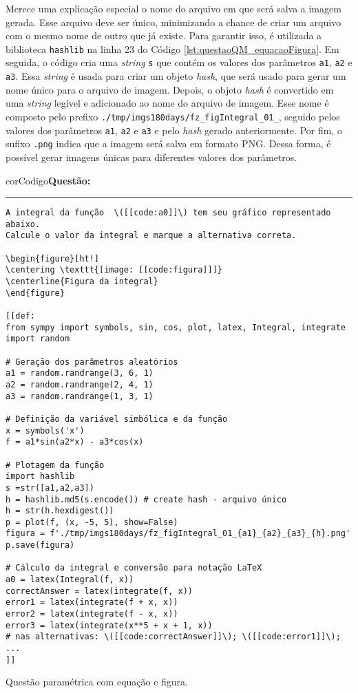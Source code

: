 Merece uma explicação especial o nome do arquivo em que será salva a imagem gerada. Esse arquivo deve ser único, minimizando a chance de criar um arquivo com o mesmo nome de outro que já existe. Para garantir isso, é utilizada a biblioteca \verb|hashlib| na linha 23 do Código \ref{lst:questaoQM_equacaoFigura}. Em seguida, o código cria uma \textit{string} \verb|s| que contém os valores dos parâmetros \verb|a1|, \verb|a2| e \verb|a3|. Essa \textit{string} é usada para criar um objeto \textit{hash}, que será usado para gerar um nome único para o arquivo de imagem. Depois, o objeto \textit{hash} é convertido em uma \textit{string} legível e adicionado ao nome do arquivo de imagem. Esse nome é composto pelo prefixo \verb|./tmp/imgs180days/fz_figIntegral_01_|, seguido pelos valores dos parâmetros \verb|a1|, \verb|a2| e \verb|a3| e pelo \textit{hash} gerado anteriormente. Por fim, o sufixo \verb|.png| indica que a imagem será salva em formato PNG. Dessa forma, é possível gerar imagens únicas para diferentes valores dos parâmetros.

\begin{listing}[!ht]
\begin{myboxCode}{corCodigo}{\textbf{Questão: }}\vspace{3mm}
\hrule
\begin{verbatim}
A integral da função  \([[code:a0]]\) tem seu gráfico representado abaixo. 
Calcule o valor da integral e marque a alternativa correta.

\begin{figure}[ht!]
\centering \texttt{[image: [[code:figura]]]} 
\centerline{Figura da integral}
\end{figure}

[[def:
from sympy import symbols, sin, cos, plot, latex, Integral, integrate
import random

# Geração dos parâmetros aleatórios
a1 = random.randrange(3, 6, 1)
a2 = random.randrange(2, 4, 1)
a3 = random.randrange(1, 3, 1)

# Definição da variável simbólica e da função
x = symbols('x')
f = a1*sin(a2*x) - a3*cos(x)

# Plotagem da função
import hashlib
s =str([a1,a2,a3]) 
h = hashlib.md5(s.encode()) # create hash - arquivo único
h = str(h.hexdigest())
p = plot(f, (x, -5, 5), show=False)
figura = f'./tmp/imgs180days/fz_figIntegral_01_{a1}_{a2}_{a3}_{h}.png'
p.save(figura)

# Cálculo da integral e conversão para notação LaTeX
a0 = latex(Integral(f, x))
correctAnswer = latex(integrate(f, x))
error1 = latex(integrate(f + x, x))
error2 = latex(integrate(f - x, x))
error3 = latex(integrate(x**5 + x + 1, x))
# nas alternativas: \([[code:correctAnswer]]\); \([[code:error1]]\); ...
]]
\end{verbatim}
\end{myboxCode}
\caption{Questão paramétrica com equação e figura.}
\label{lst:questaoQM_equacaoFigura}
\end{listing}

